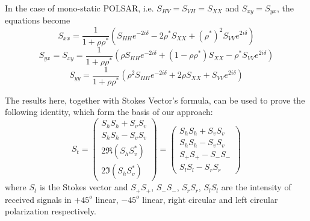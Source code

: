 In the case of mono-static POLSAR, i.e. $S_{HV}=S_{VH}=S_{XX}$ and $S_{xy}=S_{yx}$, the equations become
\begin{equation}
S_{xx} = \frac{1}{1+\rho \rho^*} 
\left( 
S_{HH} e^{-2i\delta} - 2 \rho^* S_{XX} + (\rho^*)^2 S_{VV} e^{2i\delta}
\right)
\end{equation}
\begin{equation}
S_{yx} = S_{xy}= \frac{1}{1+\rho \rho^*} 
\left( 
\rho S_{HH} e^{-2i\delta} + (1-\rho \rho^*) S_{XX} - \rho^* S_{VV} e^{2i\delta}
\right)
\end{equation}
\begin{equation}
S_{yy} = \frac{1}{1+\rho \rho^*} 
\left( 
\rho^2 S_{HH} e^{-2i\delta} + 2 \rho S_{XX} +  S_{VV} e^{2i\delta}
\right)
\end{equation}

The results here, together with Stokes Vector's formula, can be used to prove the following identity, which form the basis of our approach:
\begin{equation}
S_t = 
\left(
	\begin{array} {c}
		S_hS_h + S_vS_v \\
		S_hS_h - S_vS_v \\
		2 \Re{(S_hS_v^*)} \\
		2 \Im{(S_hS_v^*)}
	\end{array}
\right)
= 
\left(
	\begin{array} {c}
		S_hS_h + S_vS_v \\
		S_hS_h - S_vS_v \\
		S_+S_+ - S_-S_- \\
		S_lS_l - S_rS_r
	\end{array}
\right)
\end{equation}
where $S_t$ is the Stokes vector and $S_+S_+$, $S_-S_-$, $S_rS_r$, $S_lS_l$ are the intensity of received signals in $+45^o$ linear, $-45^o$ linear, right circular and left circular polarization respectively.

